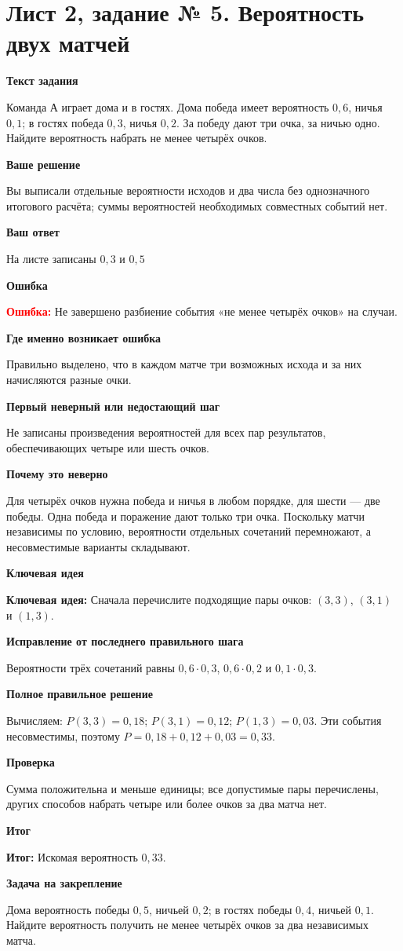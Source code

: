 \documentclass[11pt,a4paper]{article}
\newcommand{\Idea}{\textcolor{blue!60!black}{\textbf{Ключевая идея:}}}
\newcommand{\Res}{\textcolor{teal!60!black}{\textbf{Итог:}}}
\newcommand{\Heading}[2]{\par\medskip\textbf{#1}\par#2\par}
\begin{document}
\section*{Лист 2, задание № 5. Вероятность двух матчей}
\Heading{Текст задания}{Команда А играет дома и в гостях. Дома победа имеет вероятность $0{,}6$, ничья $0{,}1$; в гостях победа $0{,}3$, ничья $0{,}2$. За победу дают три очка, за ничью одно. Найдите вероятность набрать не менее четырёх очков.}
\Heading{Ваше решение}{Вы выписали отдельные вероятности исходов и два числа без однозначного итогового расчёта; суммы вероятностей необходимых совместных событий нет.}
\Heading{Ваш ответ}{На листе записаны $0{,}3$ и $0{,}5$}
\Heading{Ошибка}{\textcolor{red}{\textbf{Ошибка:}} Не завершено разбиение события «не менее четырёх очков» на случаи.}
\Heading{Где именно возникает ошибка}{Правильно выделено, что в каждом матче три возможных исхода и за них начисляются разные очки.}
\Heading{Первый неверный или недостающий шаг}{Не записаны произведения вероятностей для всех пар результатов, обеспечивающих четыре или шесть очков.}
\Heading{Почему это неверно}{Для четырёх очков нужна победа и ничья в любом порядке, для шести --- две победы. Одна победа и поражение дают только три очка. Поскольку матчи независимы по условию, вероятности отдельных сочетаний перемножают, а несовместимые варианты складывают.}
\Heading{Ключевая идея}{\Idea{} Сначала перечислите подходящие пары очков: $(3,3)$, $(3,1)$ и $(1,3)$.}
\Heading{Исправление от последнего правильного шага}{Вероятности трёх сочетаний равны $0{,}6\cdot0{,}3$, $0{,}6\cdot0{,}2$ и $0{,}1\cdot0{,}3$.}
\Heading{Полное правильное решение}{Вычисляем: $P(3,3)=0{,}18$; $P(3,1)=0{,}12$; $P(1,3)=0{,}03$. Эти события несовместимы, поэтому $P=0{,}18+0{,}12+0{,}03=0{,}33$.}
\Heading{Проверка}{Сумма положительна и меньше единицы; все допустимые пары перечислены, других способов набрать четыре или более очков за два матча нет.}
\Heading{Итог}{\Res{} Искомая вероятность $0{,}33$.}
\Heading{Задача на закрепление}{Дома вероятность победы $0{,}5$, ничьей $0{,}2$; в гостях победы $0{,}4$, ничьей $0{,}1$. Найдите вероятность получить не менее четырёх очков за два независимых матча.}
\newpage
{}\label{task:2_8}
\end{document}
